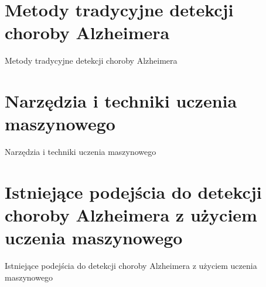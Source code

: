 \section{Metody tradycyjne detekcji choroby Alzheimera}

Metody tradycyjne detekcji choroby Alzheimera

\section{Narzędzia i techniki uczenia maszynowego}

Narzędzia i techniki uczenia maszynowego

\section{Istniejące podejścia do detekcji choroby Alzheimera z użyciem uczenia maszynowego}

Istniejące podejścia do detekcji choroby Alzheimera z użyciem uczenia maszynowego
